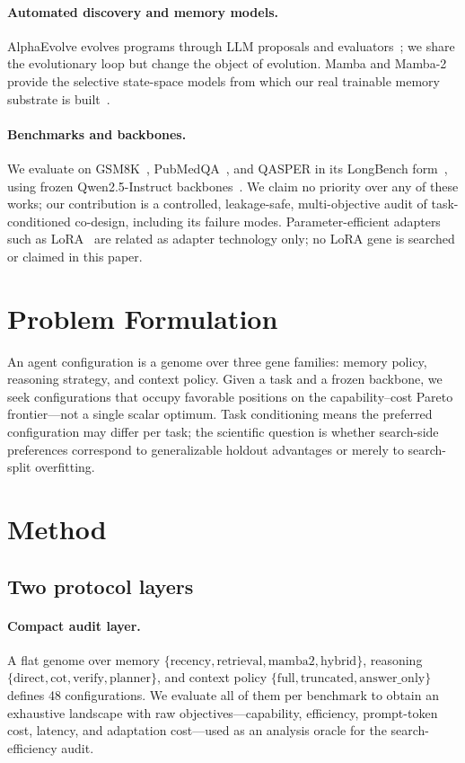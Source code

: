 \documentclass[11pt]{article}
\begin{document}
\paragraph{Automated discovery and memory models.}
AlphaEvolve evolves programs through LLM proposals and
evaluators~\citep{alphaevolve2025}; we share the evolutionary loop but
change the object of evolution. Mamba and Mamba-2 provide the selective
state-space models from which our real trainable memory substrate is
built~\citep{gu2023mamba,dao2024mamba2}.

\paragraph{Benchmarks and backbones.}
We evaluate on GSM8K~\citep{cobbe2021gsm8k}, PubMedQA~\citep{jin2019pubmedqa},
and QASPER in its LongBench form~\citep{dasigi2021qasper,bai2023longbench},
using frozen Qwen2.5-Instruct backbones~\citep{yang2024qwen25}. We claim no
priority over any of these works; our contribution is a controlled,
leakage-safe, multi-objective audit of task-conditioned co-design, including
its failure modes. Parameter-efficient adapters such as
LoRA~\citep{hu2021lora} are related as adapter technology only; no LoRA gene
is searched or claimed in this paper.

\section{Problem Formulation}

An agent configuration is a genome over three gene families: memory policy,
reasoning strategy, and context policy. Given a task and a frozen backbone,
we seek configurations that occupy favorable positions on the
capability--cost Pareto frontier---not a single scalar optimum. Task
conditioning means the preferred configuration may differ per task; the
scientific question is whether search-side preferences correspond to
generalizable holdout advantages or merely to search-split overfitting.

\section{Method}

\subsection{Two protocol layers}

\paragraph{Compact audit layer.} A flat genome over memory
$\{\text{recency}, \text{retrieval}, \text{mamba2}, \text{hybrid}\}$,
reasoning $\{\text{direct}, \text{cot}, \text{verify}, \text{planner}\}$,
and context policy $\{\text{full}, \text{truncated}, \text{answer\_only}\}$
defines 48 configurations. We evaluate all of them per benchmark to obtain
an exhaustive landscape with raw objectives---capability, efficiency,
prompt-token cost, latency, and adaptation cost---used as an analysis oracle
for the search-efficiency audit.
\end{document}
